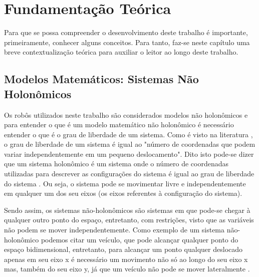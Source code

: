 %
%

\chapter{Fundamentação Teórica}
\label{chap:fundamentacaoTeorica}
Para que se possa %
compreender o desenvolvimento deste trabalho é importante, primeiramente, conhecer alguns conceitos. Para tanto, faz-se neste capítulo uma breve contextualização teórica para auxiliar o leitor ao longo deste trabalho. 

\section{Modelos Matemáticos: Sistemas Não Holonômicos}
\label{sec:modeloMatematicoNHolonomico}
Os robôs utilizados neste trabalho são considerados modelos não holonômicos e para entender o que é um modelo matemático não holonômico é necessário entender o que é o grau de liberdade de um sistema. Como é visto na literatura \cite{TJRD13}, o grau de liberdade de um sistema é igual ao "número de coordenadas que podem variar independentemente em um pequeno deslocamento". Dito isto pode-se dizer que um sistema holonômico é um sistema onde o número de coordenadas utilizadas para descrever as configurações do sistema é igual ao grau de liberdade do sistema \cite{TJRD13}. Ou seja, o sistema pode se movimentar livre e independentemente em qualquer um dos seu eixos (os eixos referentes à configuração do sistema).

Sendo assim, os sistemas não-holonômicos são sistemas em que pode-se chegar à qualquer outro ponto do espaço, entretanto, com restrições, visto que as variáveis não podem se mover independentemente. Como exemplo de um sistema não-holonômico podemos citar um veículo, que pode alcançar qualquer ponto do espaço bidimensional, entretanto, para alcançar um ponto qualquer deslocado apenas em seu eixo x é necessário um movimento não só ao longo do seu eixo x mas, também do seu eixo y, já que um veículo não pode se mover lateralmente \cite{GJA11}.

